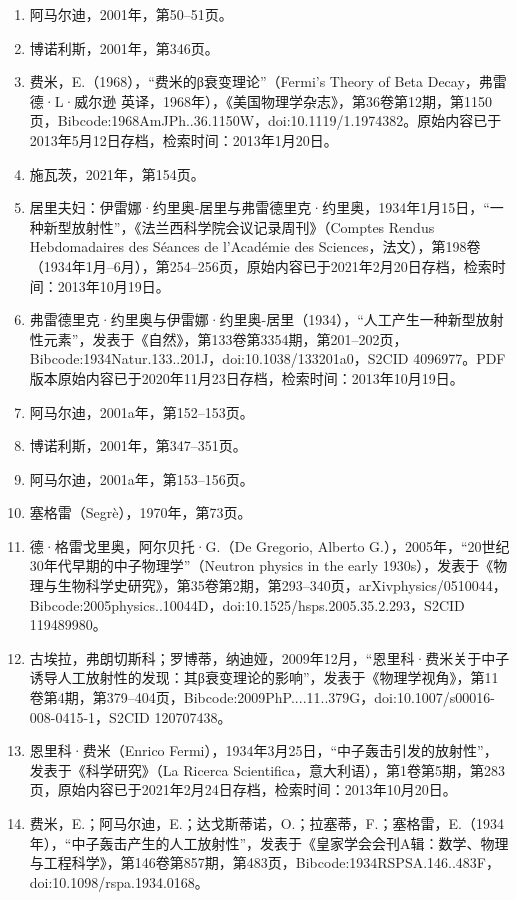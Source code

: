 \begin{enumerate}
\item 阿马尔迪，2001年，第50–51页。
\item 博诺利斯，2001年，第346页。
\item 费米，E.（1968），“费米的β衰变理论”（Fermi's Theory of Beta Decay，弗雷德·L·威尔逊  英译，1968年），《美国物理学杂志》，第36卷第12期，第1150页，Bibcode:1968AmJPh..36.1150W，doi:10.1119/1.1974382。原始内容已于2013年5月12日存档，检索时间：2013年1月20日。
\item 施瓦茨，2021年，第154页。
\item 居里夫妇：伊雷娜·约里奥-居里与弗雷德里克·约里奥，1934年1月15日，“一种新型放射性”，《法兰西科学院会议记录周刊》（Comptes Rendus Hebdomadaires des Séances de l'Académie des Sciences，法文），第198卷（1934年1月–6月），第254–256页，原始内容已于2021年2月20日存档，检索时间：2013年10月19日。
\item 弗雷德里克·约里奥与伊雷娜·约里奥-居里（1934），“人工产生一种新型放射性元素”，发表于《自然》，第133卷第3354期，第201–202页，Bibcode:1934Natur.133..201J，doi:10.1038/133201a0，S2CID 4096977。PDF版本原始内容已于2020年11月23日存档，检索时间：2013年10月19日。
\item 阿马尔迪，2001a年，第152–153页。
\item 博诺利斯，2001年，第347–351页。
\item 阿马尔迪，2001a年，第153–156页。
\item 塞格雷（Segrè），1970年，第73页。
\item 德·格雷戈里奥，阿尔贝托·G.（De Gregorio, Alberto G.），2005年，“20世纪30年代早期的中子物理学”（Neutron physics in the early 1930s），发表于《物理与生物科学史研究》，第35卷第2期，第293–340页，arXiv\:physics/0510044，Bibcode:2005physics..10044D，doi:10.1525/hsps.2005.35.2.293，S2CID 119489980。
\item 古埃拉，弗朗切斯科；罗博蒂，纳迪娅，2009年12月，“恩里科·费米关于中子诱导人工放射性的发现：其β衰变理论的影响”，发表于《物理学视角》，第11卷第4期，第379–404页，Bibcode:2009PhP....11..379G，doi:10.1007/s00016-008-0415-1，S2CID 120707438。
\item 恩里科·费米（Enrico Fermi），1934年3月25日，“中子轰击引发的放射性”，发表于《科学研究》（La Ricerca Scientifica，意大利语），第1卷第5期，第283页，原始内容已于2021年2月24日存档，检索时间：2013年10月20日。
\item 费米，E.；阿马尔迪，E.；达戈斯蒂诺，O.；拉塞蒂，F.；塞格雷，E.（1934年），“中子轰击产生的人工放射性”，发表于《皇家学会会刊A辑：数学、物理与工程科学》，第146卷第857期，第483页，Bibcode:1934RSPSA.146..483F，doi:10.1098/rspa.1934.0168。

\end{enumerate}
